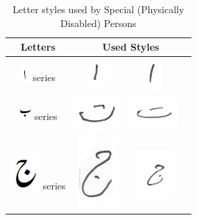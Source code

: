 \begin{table}[h]
\centering
\caption{Letter styles used by Special (Physically Disabled) Persons}\label{tab6-pdp}
\begin{tabular}{@{}cccc@{}}
\hline
Letters	& \multicolumn{3}{c}{\textbf{Used Styles}} \\ \hline
\includegraphics[scale=0.50]{alif.png} series & \includegraphics[scale=0.25]{119} & \includegraphics[scale=0.25]{120}  &   \\ 
\hline
\includegraphics[scale=0.50]{bay} series & \includegraphics[scale=0.20]{121} & \includegraphics[scale=0.20]{122}  &  \\
\hline
\includegraphics[scale=0.25]{jeeem} series & \includegraphics[scale=0.20]{123} & \includegraphics[scale=0.20]{124}  &  \\

\end{tabular}
\end{table}
